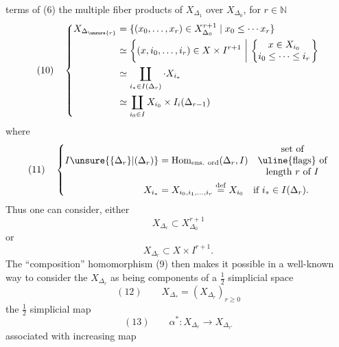 terms of (6) the multiple fiber products
of $X_{\Delta_1}$ over $X_{\Delta_0}$, for $r\in\mathbb N$
\[
(10)\quad\left\{\begin{aligned}
X_{\Delta_{\unsure{r}}}&=\{(x_0,\ldots,x_r)\in X_{\Delta_0}^{r+1}\mid x_0\leq\cdots x_r\}\\
&\simeq\left\{(x,i_0,\ldots,i_r)\in X\times I^{r+1}\ \middle|\ \left\{\begin{matrix}x\in X_{i_0}\\i_0\leq\cdots\leq i_r\end{matrix}\right.\right\}\\
&\simeq\coprod_{i_*\in I(\Delta_r)}\cdot X_{i_*}\\
&\simeq\coprod_{i_0\in I}X_{i_0}\times I_i(\Delta_{r-1})
\end{aligned}\right.
\]
where
\[
(11)\quad\left\{\begin{aligned}
I\unsure{\{\Delta_r\}|(\Delta_r)}&=\operatorname{Hom}_{\text{ens. ord}}(\Delta_r,I)
\quad\begin{matrix}\text{set of}\\\text{\uline{flags} of}\\\text{length }r\text{ of }I\end{matrix}\\
X_{i_*}&=X_{i_0,i_1,\ldots,i_r}\overset{\mathrm{def}}{=}X_{i_0}\quad\text{if }i_*\in I(\Delta_r).
\end{aligned}\right.
\]
Thus one can consider, either
\[
X_{\Delta_r}\subset X_{\Delta_0}^{r+1}
\]
or
\[
X_{\Delta_r}\subset X\times I^{r+1}.
\]
The ``composition'' homomorphism (9)
then makes it possible in a well-known way to
consider the $X_{\Delta_r}$ as being 
components of a $\frac12$ simplicial space
\[
(12)\qquad X_{\Delta_*}=(X_{\Delta_r})_{r\geq0}
\]
 the $\frac12$ simplicial map
\[
(13)\qquad\alpha^*:X_{\Delta_r}\longrightarrow X_{\Delta_{r'}}
\]
associated with  increasing map
